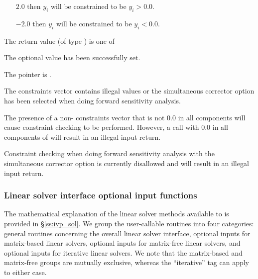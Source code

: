 {{\begin{args}
\begin{itemize}
    \item[$2.0$] then $y_i$ will be constrained to be $y_i > 0.0$.
    \item[$-2.0$] then $y_i$ will be constrained to be $y_i < 0.0$.
    \end{itemize}
  \end{args}
}
{
  The return value  (of type ) is one of
  \begin{args}
  \item[\Id{IDA\_SUCCESS}]
    The optional value has been successfully set.
  \item[\Id{IDA\_MEM\_NULL}]
    The  pointer is .
  \item[\Id{IDA\_ILL\_INPUT}]
    The constraints vector contains illegal values or the simultaneous corrector
    option has been selected when doing forward sensitivity analysis.
  \end{args}
}
{
  The presence of a non- constraints vector that is not $0.0$ in
  all components will cause constraint checking to be performed.
  However, a call with $0.0$ in all components of  will
  result in an illegal input return.

  Constraint checking when doing forward sensitivity analysis with the
  simultaneous corrector option is currently disallowed and will result in an
  illegal input return.
}

\subsubsection{Linear solver interface optional input functions}
\label{sss:optin_ls}

The mathematical explanation of the linear solver methods
available to {\idas} is provided in \S\ref{ss:ivp_sol}.  We
group the user-callable routines into four categories: general
routines concerning the overall {\idals} linear solver interface,
optional inputs for matrix-based linear solvers, optional inputs for
matrix-free linear solvers, and optional inputs for iterative linear
solvers.  We note that the matrix-based and matrix-free groups are
mutually exclusive, whereas the ``iterative'' tag can apply to either
case.

}
